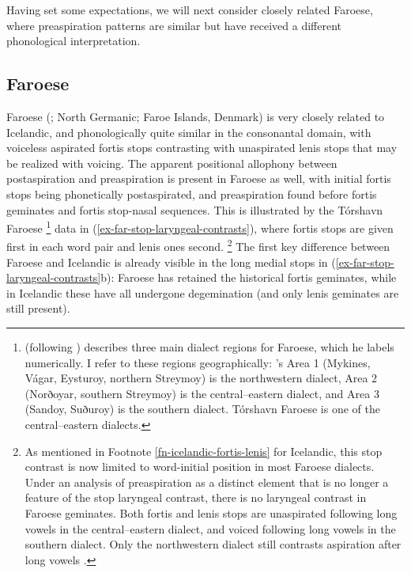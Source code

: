 \documentclass[output=paper,colorlinks,citecolor=brown]{langscibook}
\begin{document}
Having set some expectations, we will next consider closely related Faroese, where preaspiration patterns are similar but have received a different phonological interpretation. 

\subsection{Faroese}
\label{sec-faroese}

Faroese (; North Germanic; Faroe Islands, Denmark) is very closely related to Icelandic, and phonologically quite similar in the consonantal domain, with voiceless aspirated fortis stops contrasting with unaspirated lenis stops that may be realized with voicing. The apparent positional allophony between postaspiration and preaspiration is present in Faroese as well, with initial fortis stops being phonetically postaspirated, and preaspiration found before fortis geminates and fortis stop-nasal sequences. This is illustrated by the Tórshavn Faroese%
\footnote{\citet{Helgason2002} (following \citealp{petersen1995}) describes three main dialect regions for Faroese, which he labels numerically. I refer to these regions geographically: \citeauthor{Helgason2002}'s Area 1 (Mykines, Vágar, Eysturoy, northern Streymoy) is the northwestern dialect, Area 2 (Norðoyar, southern Streymoy) is the central--eastern dialect, and Area 3 (Sandoy, Suðuroy) is the southern dialect. Tórshavn Faroese is one of the central--eastern dialects.}
data in (\ref{ex-far-stop-laryngeal-contrasts}), where fortis stops are given first in each word pair and lenis ones second.%
\footnote{As mentioned in Footnote \ref{fn-icelandic-fortis-lenis} for Icelandic, this stop contrast is now limited to word-initial position in most Faroese dialects. Under an analysis of preaspiration as a distinct element that is no longer a feature of the stop laryngeal contrast, there is no laryngeal contrast in Faroese geminates. Both fortis and lenis stops are unaspirated following long vowels in the central--eastern dialect, and voiced following long vowels in the southern dialect. Only the northwestern dialect still contrasts aspiration after long vowels \citep{Helgason2002}.}
The first key difference between Faroese and Icelandic is already visible in the long medial stops in (\ref{ex-far-stop-laryngeal-contrasts}b): Faroese has retained the historical fortis geminates, while in Icelandic these have all undergone degemination (and only lenis geminates are still present).%
\end{document}
